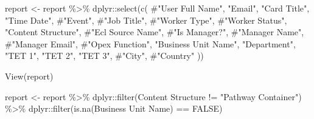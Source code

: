 \documentclass[
  letterpaper,
  DIV=11,
  numbers=noendperiod]{scrartcl}
\newenvironment{Shaded}{\begin{snugshade}}{\end{snugshade}}
\newcommand{\AttributeTok}[1]{\textcolor[rgb]{0.40,0.45,0.13}{#1}}
\newcommand{\CommentTok}[1]{\textcolor[rgb]{0.37,0.37,0.37}{#1}}
\newcommand{\ConstantTok}[1]{\textcolor[rgb]{0.56,0.35,0.01}{#1}}
\newcommand{\FunctionTok}[1]{\textcolor[rgb]{0.28,0.35,0.67}{#1}}
\newcommand{\NormalTok}[1]{\textcolor[rgb]{0.00,0.23,0.31}{#1}}
\newcommand{\OtherTok}[1]{\textcolor[rgb]{0.00,0.23,0.31}{#1}}
\newcommand{\SpecialCharTok}[1]{\textcolor[rgb]{0.37,0.37,0.37}{#1}}
\newcommand{\StringTok}[1]{\textcolor[rgb]{0.13,0.47,0.30}{#1}}
\begin{document}
\begin{Shaded}
\begin{Highlighting}[]
\NormalTok{report }\OtherTok{\textless{}{-}}\NormalTok{ report }\SpecialCharTok{\%\textgreater{}\%}
\NormalTok{  dplyr}\SpecialCharTok{::}\FunctionTok{select}\NormalTok{(}\FunctionTok{c}\NormalTok{(}
  \CommentTok{\#"User Full Name", }
  \StringTok{"Email"}\NormalTok{, }
  \StringTok{"Card Title"}\NormalTok{, }
  \StringTok{"Time Date"}\NormalTok{, }
  \CommentTok{\#"Event", }
  \CommentTok{\#"Job Title", }
  \CommentTok{\#"Worker Type", }
  \CommentTok{\#"Worker Status", }
  \StringTok{"Content Structure"}\NormalTok{, }
  \CommentTok{\#"Ecl Source Name", }
  \CommentTok{\#"Is Manager?", }
  \CommentTok{\#"Manager Name", }
  \CommentTok{\#"Manager Email", }
  \CommentTok{\#"Opex Function", }
  \StringTok{"Business Unit Name"}\NormalTok{, }
  \StringTok{"Department"}\NormalTok{, }
  \StringTok{"TET 1"}\NormalTok{, }
  \StringTok{"TET 2"}\NormalTok{, }
  \StringTok{"TET 3"}\NormalTok{, }
  \CommentTok{\#"City", }
  \CommentTok{\#"Country"}
\NormalTok{))}

\FunctionTok{View}\NormalTok{(report)}
\end{Highlighting}
\end{Shaded}

\begin{Shaded}
\begin{Highlighting}[]
\NormalTok{report }\OtherTok{\textless{}{-}}\NormalTok{ report }\SpecialCharTok{\%\textgreater{}\%}\NormalTok{ dplyr}\SpecialCharTok{::}\FunctionTok{filter}\NormalTok{(}\StringTok{\textasciigrave{}}\AttributeTok{Content Structure}\StringTok{\textasciigrave{}} \SpecialCharTok{!=} \StringTok{"Pathway Container"}\NormalTok{) }\SpecialCharTok{\%\textgreater{}\%}
\NormalTok{  dplyr}\SpecialCharTok{::}\FunctionTok{filter}\NormalTok{(}\FunctionTok{is.na}\NormalTok{(}\StringTok{\textasciigrave{}}\AttributeTok{Business Unit Name}\StringTok{\textasciigrave{}}\NormalTok{) }\SpecialCharTok{==} \ConstantTok{FALSE}\NormalTok{)}
\end{Highlighting}
\end{Shaded}
\end{document}
